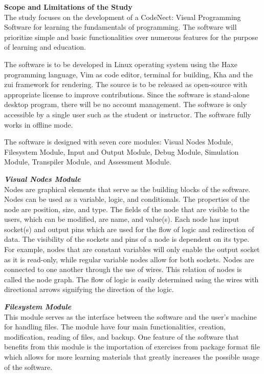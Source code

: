 \flushleft
\textbf{Scope and Limitations of the Study}\\
\justifying
\parx
The study focuses on the development of a CodeNect: Visual Programming Software
for learning the fundamentals of programming. The software will prioritize
simple and basic functionalities over numerous features for the purpose of
learning and education.

The software is to be developed in Linux operating system using the Haxe programming
language, Vim as code editor, terminal for building, Kha and the zui framework for
rendering.
The source is to be released as open-source with appropriate license to improve
contributions. Since the software is stand-alone desktop program, there will be no
account management. The software is only accessible by a single user such as the
student or instructor.
The software fully works in offline mode.

The software is designed with seven core modules: Visual Nodes Module,
Filesystem Module, Input and Output Module, Debug Module, Simulation Module,
Transpiler Module, and Assessment Module.

\flushleft
\textbf{\textit{Visual Nodes Module}}\\
\justifying
\parx
Nodes are graphical elements that serve as the building blocks of the software.
Nodes can be used as a variable, logic, and conditionals. The properties of the node
are position, size, and type. The fields of the node that are visible to the
users, which can be modified, are name, and value(s). Each node has input
socket(s) and output pins which are used for the flow of logic and redirection
of data. The visibility of the sockets and pins of a node is dependent on its
type.  For example, nodes that are constant variables will only enable the
output socket as it is read-only, while regular variable nodes allow for both
sockets.  Nodes are connected to one another through the use of wires. This
relation of nodes is called the node graph. The flow of logic is easily
determined using the wires with directional arrows signifying the direction of
the logic.

\flushleft
\textbf{\textit{Filesystem Module}}\\
\justifying
\parx
This module serves as the interface between the software and the user's machine for
handling files. The module have four main functionalities, creation, modification,
reading of files, and backup. One feature of the software that benefits from this
module is the importation of exercises from package format file which allows for
more learning materials that greatly increases the possible usage of the software.

